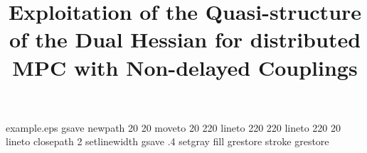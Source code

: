 %
%
%
%
%
\begin{filecontents*}{example.eps}
gsave
newpath
  20 20 moveto
  20 220 lineto
  220 220 lineto
  220 20 lineto
closepath
2 setlinewidth
gsave
  .4 setgray fill
grestore
stroke
grestore
\end{filecontents*}
%
\RequirePackage{fix-cm}
%
\documentclass[smallextended]{svjour3}       %
%
\smartqed  %
%
\usepackage{graphicx}
\usepackage{amsmath}              
  {
      \newtheorem{assumption}{Assumption}
  }
\usepackage{amssymb}
\usepackage{graphicx}
\usepackage{caption}

\usepackage{color}
\newcommand{\Seb}[1]{
\begin{center}
\fcolorbox{seb}{seb}{\parbox[t]{0.45\textwidth}{\textbf{Seb:} #1}}
\end{center}}

%
%
%
%
%


\title{Exploitation of the Quasi-structure of the Dual Hessian for distributed MPC with Non-delayed Couplings%
}


